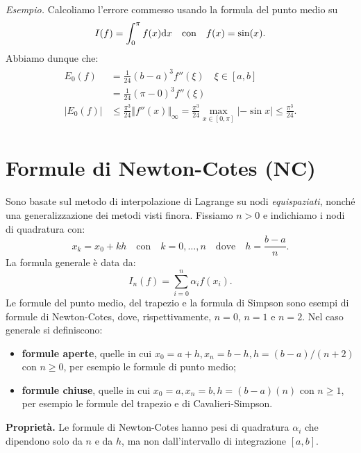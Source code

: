 \textit{Esempio.} Calcoliamo l'errore commesso usando la formula del punto medio su
\begin{gather*}
I(f) =\int\nolimits ^{\pi }_{0} f(x) \mathrm d x \quad \text{con} \quad f(x) =\sin(x).
\end{gather*}
Abbiamo dunque che:
\begin{gather*}
\begin{aligned}
E_{0}(f) & =\frac{1}{24}( b-a)^{3} f''( \xi ) \quad \xi \in [ a,b]\\
 & =\frac{1}{24}( \pi -0)^{3} f''( \xi )\\
| E_{0}(f)|  & \leqslant \frac{\pi ^{3}}{24}\Vert f''(x)\Vert _{\infty }=\frac{\pi ^{3} }{24} \max_{x\in [ 0,\pi ]}| -\sin x| \leqslant \frac{\pi ^{3}}{24}.
\end{aligned}
\end{gather*}

\section{Formule di Newton-Cotes (NC)}
Sono basate sul metodo di interpolazione di Lagrange su nodi \textit{equispaziati}, nonché una generalizzazione dei metodi visti finora.
Fissiamo $n >0$ e indichiamo i nodi di quadratura con:
\begin{equation*}
x_{k} =x_{0} +kh \quad \text{con} \quad k=0,\dotsc ,n\quad \text{dove} \quad h=\frac{b-a}{n}.
\end{equation*}
La formula generale è data da:
\begin{equation*}
I_{n}(f) =\sum\limits ^{n}_{i=0} \alpha _{i} f( x_{i}).
\end{equation*}
Le formule del punto medio, del trapezio e la formula di Simpson sono esempi di formule di Newton-Cotes, dove, rispettivamente, $n=0$, $n=1$ e $n=2$. Nel caso generale si definiscono:
\begin{itemize}
\item \textbf{formule aperte}, quelle in cui $x_{0} =a+h,x_{n} =b-h,h=(b-a)/(n+2)$ con $n\geqslant 0$, per esempio le formule di punto medio;
\item \textbf{formule chiuse}, quelle in cui $x_{0} =a,x_{n} =b,h=(b-a)(n)$ con $n \geqslant 1$, per esempio le formule del trapezio e di Cavalieri-Simpson.
\end{itemize}

\textbf{Proprietà.}
Le formule di Newton-Cotes hanno pesi di quadratura $\alpha _{i}$ che dipendono solo da $n$ e da $h$, ma non dall’intervallo di integrazione $[ a,b]$.

